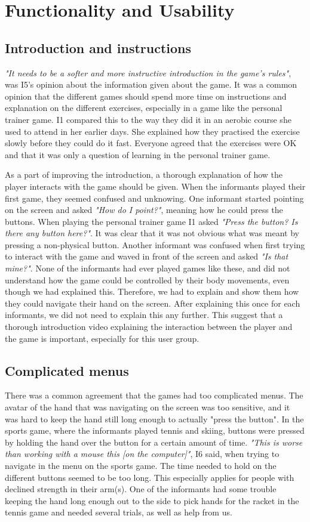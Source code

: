 \section{Functionality and Usability}
\subsection{Introduction and instructions}
\emph{"It needs to be a softer and more instructive introduction in the game's rules"}, was I5's opinion about the information given about the game. It was a common opinion that the different games should spend more time on instructions and explanation on the different exercises, especially in a game like the personal trainer game. I1 compared this to the way they did it in an aerobic course she used to attend in her earlier days. She explained how they practised the exercise slowly before they could do it fast. Everyone agreed that the exercises were OK and that it was only a question of learning in the personal trainer game. 

As a part of improving the introduction, a thorough explanation of how the player interacts with the game should be given. When the informants played their first game, they seemed confused and unknowing. One informant started pointing on the screen and asked \emph{"How do I point?"}, meaning how he could press the buttons. When playing the personal trainer game I1 asked \emph{"Press the button? Is there any button here?"}. It was clear that it was not obvious what was meant by pressing a non-physical button. Another informant was confused when first trying to interact with the game and waved in front of the screen and asked \emph{"Is that mine?"}.  None of the informants had ever played games like these, and did not understand how the game could be controlled by their body movements, even though we had explained this. Therefore, we had to explain and show them how they could navigate their hand on the screen. After explaining this once for each informants, we did not need to explain this any further. This suggest that a thorough introduction video explaining the interaction between the player and the game is important, especially for this user group. 

\subsection{Complicated menus}
There was a common agreement that the games had too complicated menus.  The avatar of the hand that was navigating on the screen was too sensitive, and it was hard to keep the hand still long enough to actually "press the button". In the sports game, where the informants played tennis and skiing, buttons were pressed by holding the hand over the button for a certain amount of time. \emph{"This is worse than working with a mouse this [on the computer]"}, I6 said, when trying to navigate in the menu on the sports game. The time needed to hold on the different buttons seemed to be too long. This especially applies for people with declined strength in their arm(s). One of the informants had some trouble keeping the hand long enough out to the side to pick hands for the racket in the tennis game and needed several trials, as well as help from us.

